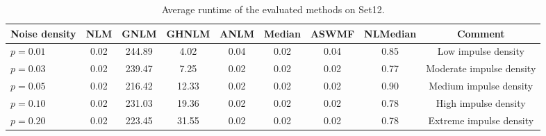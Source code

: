 \begin{table}[!t]
\centering
\caption{Average runtime of the evaluated methods on Set12.}
\label{tab:runtime-set12}
\scriptsize
\begin{tabular}{lcccccccc}
\toprule
Noise density & NLM & GNLM & GHNLM & ANLM & Median & ASWMF & NLMedian & Comment \\
\midrule
\(p=0.01\) & 0.02 & 244.89 & 4.02 & 0.04 & 0.02 & 0.04 & 0.85 & Low impulse density \\
\(p=0.03\) & 0.02 & 239.47 & 7.25 & 0.02 & 0.02 & 0.02 & 0.77 & Moderate impulse density \\
\(p=0.05\) & 0.02 & 216.42 & 12.33 & 0.02 & 0.02 & 0.02 & 0.90 & Medium impulse density \\
\(p=0.10\) & 0.02 & 231.03 & 19.36 & 0.02 & 0.02 & 0.02 & 0.78 & High impulse density \\
\(p=0.20\) & 0.02 & 223.45 & 31.55 & 0.02 & 0.02 & 0.02 & 0.78 & Extreme impulse density \\
\bottomrule
\end{tabular}
\end{table}